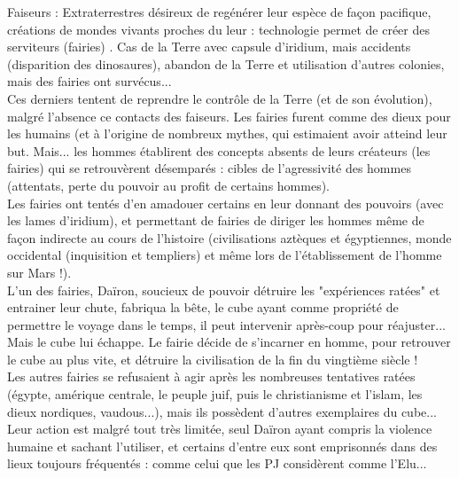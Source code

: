 \documentclass[11pt,twoside,a4paper]{book}
\begin{document}
Faiseurs : Extraterrestres d{\'e}sireux de reg{\'e}n{\'e}rer leur esp{\`e}ce de fa\c{c}on pacifique, cr{\'e}ations de mondes vivants proches du leur : technologie permet de cr{\'e}er des serviteurs (fairies) . Cas de la Terre avec capsule d'iridium, mais accidents (disparition des dinosaures), abandon de la Terre et utilisation d'autres colonies, mais des fairies ont surv{\'e}cus... ~\\

Ces derniers tentent de reprendre le contr{\^o}le de la Terre (et de son {\'e}volution), malgr{\'e} l'absence ce contacts des faiseurs. Les fairies furent comme des dieux pour les humains (et {\`a} l'origine de nombreux mythes, qui estimaient avoir atteind leur but. Mais... les hommes {\'e}tablirent des concepts absents de leurs cr{\'e}ateurs (les fairies) qui se retrouv{\`e}rent d{\'e}sempar{\'e}s : cibles de l'agressivit{\'e} des hommes (attentats, perte du pouvoir au profit de certains hommes). ~\\

Les fairies ont tent{\'e}s d'en amadouer certains en leur donnant des pouvoirs (avec les lames d'iridium), et permettant de fairies de diriger les hommes m{\^e}me de fa\c{c}on indirecte au cours de l'histoire (civilisations azt{\`e}ques et {\'e}gyptiennes, monde occidental (inquisition et templiers) et m{\^e}me lors de l'{\'e}tablissement de l'homme sur Mars !). ~\\

L'un des fairies, Da{\"i}ron, soucieux de pouvoir d{\'e}truire les "exp{\'e}riences rat{\'e}es" et entrainer leur chute, fabriqua la b{\^e}te, le cube ayant comme propri{\'e}t{\'e} de permettre le voyage dans le temps, il peut intervenir apr{\`e}s-coup pour r{\'e}ajuster... Mais le cube lui {\'e}chappe. Le fairie d{\'e}cide de s'incarner en homme, pour retrouver le cube au plus vite, et d{\'e}truire la civilisation de la fin du vingti{\`e}me si{\`e}cle ! ~\\

Les autres fairies se refusaient {\`a} agir apr{\`e}s les nombreuses tentatives rat{\'e}es ({\'e}gypte, am{\'e}rique centrale, le peuple juif, puis le christianisme et l'islam, les dieux nordiques, vaudous...), mais ils poss{\`e}dent d'autres exemplaires du cube... Leur action est malgr{\'e} tout tr{\`e}s limit{\'e}e, seul Da{\"i}ron ayant compris la violence humaine et sachant l'utiliser, et certains d'entre eux sont emprisonn{\'e}s dans des lieux toujours fr{\'e}quent{\'e}s : comme celui que les PJ consid{\`e}rent comme l'Elu... ~\\
\end{document}
